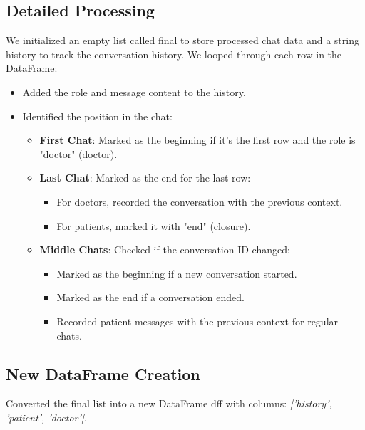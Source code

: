 %
\subsection{Detailed Processing}
We initialized an empty list called {final} to store processed chat data and a string {history} to track the conversation history. We looped through each row in the DataFrame:
\begin{itemize}
    \item Added the role and message content to the {history}.
    \item Identified the position in the chat:
    \begin{itemize}
        \item \textbf{First Chat}: Marked as the beginning if it's the first row and the role is "doctor" (doctor).
        \item \textbf{Last Chat}: Marked as the end for the last row:
        \begin{itemize}
            \item For doctors, recorded the conversation with the previous context.
            \item For patients, marked it with "end" (closure).
        \end{itemize}
        \item \textbf{Middle Chats}: Checked if the conversation ID changed:
        \begin{itemize}
            \item Marked as the beginning if a new conversation started.
            \item Marked as the end if a conversation ended.
            \item Recorded patient messages with the previous context for regular chats.
        \end{itemize}
    \end{itemize}
\end{itemize}

\subsection{New DataFrame Creation}
Converted the {final} list into a new DataFrame {dff} with columns: \textit{['history', 'patient', 'doctor']}.

